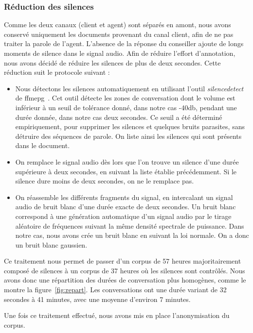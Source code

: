 \subsubsection{Réduction des silences}
Comme les deux canaux (client et agent) sont séparés en amont, nous avons conservé uniquement les documents provenant du canal client, afin de ne pas traiter la parole de l'agent.
L'absence de la réponse du conseiller ajoute de longs moments de silence dans le signal audio. Afin de réduire l'effort d'annotation, nous avons décidé de réduire les silences de plus de deux secondes. Cette réduction suit le protocole suivant :
\begin{itemize}
  \item Nous détectons les silences automatiquement en utilisant l'outil \textit{silencedetect} de ffmepg~\cite{Tomar2006}. Cet outil détecte les zones de conversation dont le volume est inférieur à un seuil de tolérance donné, dans notre cas -40db, pendant une durée donnée, dans notre cas deux secondes. Ce seuil a été déterminé empiriquement, pour supprimer les silences et quelques bruits parasites, sans détruire des séquences de parole. On liste ainsi les silences qui sont présents dans le document.
  \item On remplace le signal audio dès lors que l'on trouve un silence d'une durée supérieure à deux secondes, en suivant la liste établie précédemment. Si le silence dure moins de deux secondes, on ne le remplace pas.
  \item On réassemble les différents fragments du signal, en intercalant un signal audio de bruit blanc d'une durée exacte de deux secondes. Un bruit blanc correspond à une génération automatique d'un signal audio par le tirage aléatoire de fréquences suivant la même densité spectrale de puissance. Dans notre cas, nous avons crée un bruit blanc en suivant la loi normale. On a donc un bruit blanc gaussien.
\end{itemize}



Ce traitement nous permet de passer d'un corpus de 57 heures majoritairement composé de silences à un corpus de 37 heures où les silences sont contrôlés. Nous avons donc une répartition des durées de conversation plus homogènes, comme le montre la figure~\ref{fig:repart}. Les conversations ont une durée variant de 32 secondes à 41 minutes, avec une moyenne d'environ 7 minutes.

Une fois ce traitement effectué, nous avons mis en place l'anonymisation du corpus.

